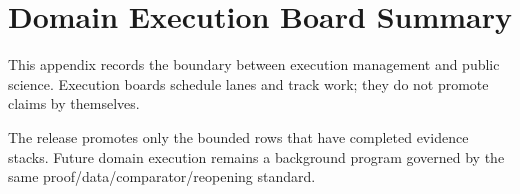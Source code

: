 \section{Domain Execution Board Summary}

\label{sec:oc-core-1-3-domain-execution-board-summary}

This appendix records the boundary between execution management and public science. Execution boards schedule lanes and track work; they do not promote claims by themselves.


The release promotes only the bounded rows that have completed evidence stacks. Future domain execution remains a background program governed by the same proof/data/comparator/reopening standard.
